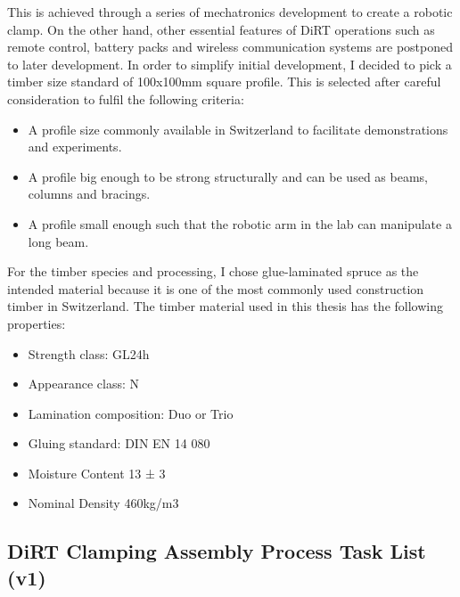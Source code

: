 This is achieved through a series of mechatronics development to create a robotic clamp. On the other hand, other essential features of DiRT operations such as remote control, battery packs and wireless communication systems are postponed to later development.
In order to simplify initial development, I decided to pick a timber size standard of 100x100mm square profile. This is selected after careful consideration to fulfil the following criteria:
\begin{itemize}
    \item A profile size commonly available in Switzerland to facilitate demonstrations and experiments.
    \item A profile big enough to be strong structurally and can be used as beams, columns and bracings.
    \item A profile small enough such that the robotic arm in the lab can manipulate a long beam.
\end{itemize}

For the timber species and processing, I chose glue-laminated spruce as the intended material because it is one of the most commonly used construction timber in Switzerland. The timber material used in this thesis has the following properties:
\begin{itemize}
    \item Strength class: GL24h 
    \item Appearance class: N
    \item Lamination composition: Duo or Trio
    \item Gluing standard: DIN EN 14 080 
    \item Moisture Content 13 ± 3%
    \item Nominal Density 460kg/m3
\end{itemize}

\subsection{DiRT Clamping Assembly Process Task List (v1)}

